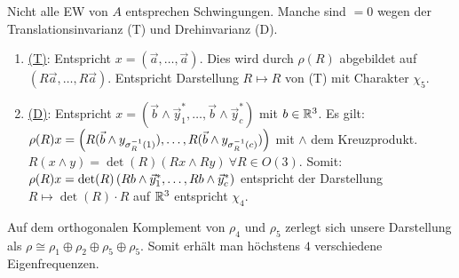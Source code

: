 Nicht alle EW von $A$ entsprechen Schwingungen. Manche sind $=0$ wegen der
Translationsinvarianz (T) und Drehinvarianz (D).
\begin{enumerate}[]
    \item \underline{(T)}: Entspricht $x = (\vec{a},\dots,\vec{a})$. Dies
        wird durch $\rho(R)$ abgebildet auf $(R\vec{a},\dots,R\vec{a})$.
        Entspricht Darstellung $R \mapsto R$ von (T) mit Charakter $\chi_5$.
    \item \underline{(D)}: Entspricht $x = (\vec{b} \wedge \vec{y}_1^\ast,\dots,
        \vec{b} \wedge \vec{y}_c^\ast)$ mit $b \in \mathbb{R}^3$. Es gilt:
        $\rho(R) x = \left( R(\vec{b} \wedge y_{\sigma_R^{-1} (1)}),\dots,
        R (\vec{b} \wedge y_{\sigma_R^{-1} (c)}) \right)$ mit $\wedge$ dem Kreuzprodukt.
        $R(x \wedge y) = \det(R) (R x \wedge R y) \ \forall R \in O(3)$. Somit:
        $\rho(R) x = \det(R) \left( R b \wedge \vec{y}_1^\ast ,\dots, R b \wedge
        \vec{y}_c^\ast \right)$ entspricht der Darstellung $R \mapsto \det(R) \cdot R$
        auf $\mathbb{R}^3$ entspricht $\chi_4$.
\end{enumerate}
Auf dem orthogonalen Komplement von $\rho_4$ und $\rho_5$ zerlegt sich unsere
Darstellung als $\rho \cong \rho_1 \oplus \rho_2 \oplus \rho_5 \oplus \rho_5$.
Somit erhält man höchstens $4$ verschiedene Eigenfrequenzen.


